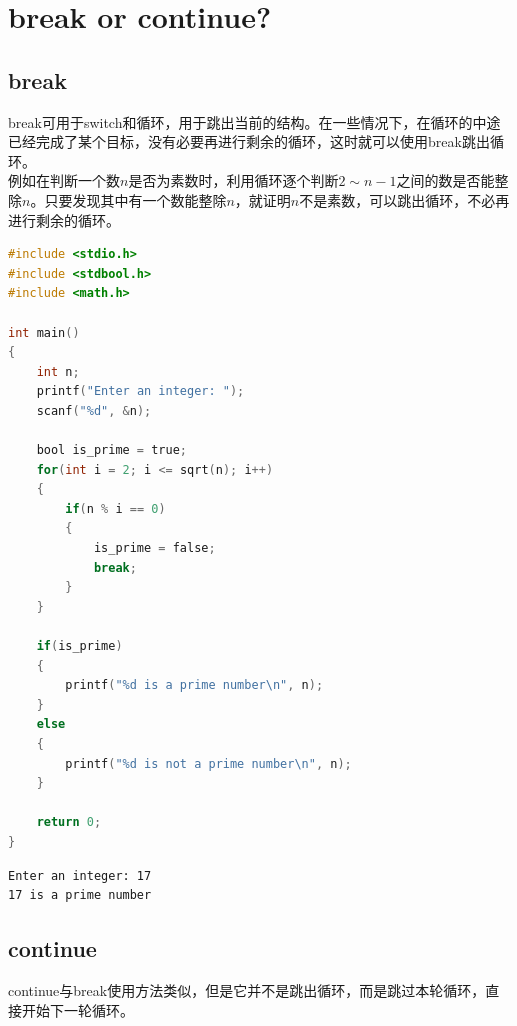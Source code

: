 \newpage

\section{break or continue?}

\subsection{break}

break可用于switch和循环，用于跳出当前的结构。在一些情况下，在循环的中途已经完成了某个目标，没有必要再进行剩余的循环，这时就可以使用break跳出循环。\\

例如在判断一个数$ n $是否为素数时，利用循环逐个判断$ 2 \sim n - 1 $之间的数是否能整除$ n $。只要发现其中有一个数能整除$ n $，就证明$ n $不是素数，可以跳出循环，不必再进行剩余的循环。\\


\begin{lstlisting}[language=C]
#include <stdio.h>
#include <stdbool.h>
#include <math.h>

int main()
{
    int n;
    printf("Enter an integer: ");
    scanf("%d", &n);

    bool is_prime = true;
    for(int i = 2; i <= sqrt(n); i++)
    {
        if(n % i == 0)
        {
            is_prime = false;
            break;
        }
    }

    if(is_prime)
    {
        printf("%d is a prime number\n", n);
    }
    else
    {
        printf("%d is not a prime number\n", n);
    }

    return 0;
}
\end{lstlisting}

\begin{tcolorbox}
    \begin{verbatim}
Enter an integer: 17
17 is a prime number
\end{verbatim}
\end{tcolorbox}

\vspace{0.5cm}

\subsection{continue}

continue与break使用方法类似，但是它并不是跳出循环，而是跳过本轮循环，直接开始下一轮循环。\\

